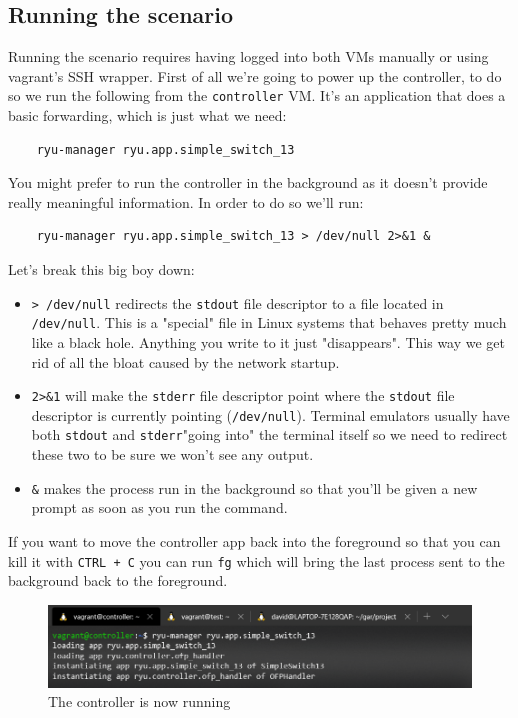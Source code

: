 \documentclass[12pt]{article}
\begin{document}
	\subsection{Running the scenario}
		Running the scenario requires having logged into both VMs manually or using vagrant's SSH wrapper. First of all we're going to power up the controller, to do so we run the following from the \texttt{controller} VM. It's an application that does a basic forwarding, which is just what we need:

		\begin{verbatim}
	ryu-manager ryu.app.simple_switch_13
		\end{verbatim}

		You might prefer to run the controller in the background as it doesn't provide really meaningful information. In order to do so we'll run:

		\begin{verbatim}
	ryu-manager ryu.app.simple_switch_13 > /dev/null 2>&1 &
		\end{verbatim}

		Let's break this big boy down:

		\begin{itemize}
			\item \texttt{> /dev/null} redirects the \texttt{stdout} file descriptor to a file located in \texttt{/dev/null}. This is a "special" file in Linux systems that behaves pretty much like a black hole. Anything you write to it just "disappears". This way we get rid of all the bloat caused by the network startup.
			\item \texttt{2>\&1} will make the \texttt{stderr} file descriptor point where the \texttt{stdout} file descriptor is currently pointing (\texttt{/dev/null}). Terminal emulators usually have both \texttt{stdout} and \texttt{stderr}"going into" the terminal itself so we need to redirect these two to be sure we won't see any output.
			\item \texttt{\&} makes the process run in the background so that you'll be given a new prompt as soon as you run the command.
		\end{itemize}

		If you want to move the controller app back into the foreground so that you can kill it with \texttt{CTRL + C} you can run \texttt{fg} which will bring the last process sent to the background back to the foreground.

		\begin{figure}[!htb]
			\centering
			\includegraphics[width=\linewidth]{controller_ex.png}
			\caption{The controller is now running}
		\end{figure}
\end{document}
